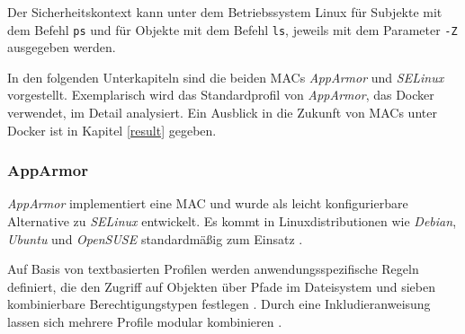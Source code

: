 \documentclass[../main.tex]{subfiles}
\begin{document}
{			Der Sicherheitskontext kann unter dem Betriebssystem Linux für Subjekte mit dem Befehl \texttt{ps} und für Objekte mit dem Befehl \texttt{ls}, jeweils mit dem Parameter \texttt{-Z} ausgegeben werden.








			In den folgenden Unterkapiteln sind die beiden MACs \emph{AppArmor} und \emph{SELinux} vorgestellt. Exemplarisch wird das Standardprofil von \emph{AppArmor}, das Docker verwendet, im Detail analysiert. Ein Ausblick in die Zukunft von MACs unter Docker ist in Kapitel \ref{result} gegeben.

			\subsubsection{AppArmor}
				\emph{AppArmor} implementiert eine MAC und wurde als leicht konfigurierbare Alternative zu \emph{SELinux} entwickelt. Es kommt in Linuxdistributionen wie \emph{Debian}, \emph{Ubuntu} und \emph{OpenSUSE} standardmäßig zum Einsatz \cite{apparmorUbuntu}.

				Auf Basis von textbasierten Profilen werden anwendungsspezifische Regeln definiert, die den Zugriff auf Objekten über Pfade im Dateisystem und sieben kombinierbare Berechtigungstypen festlegen \cite{linuxSecOverview}\cite{apparmorQuickProfileLanguage}. Durch eine Inkludieranweisung lassen sich mehrere Profile modular kombinieren \cite{apparmorQuickProfileLanguage}.

}
\end{document}

